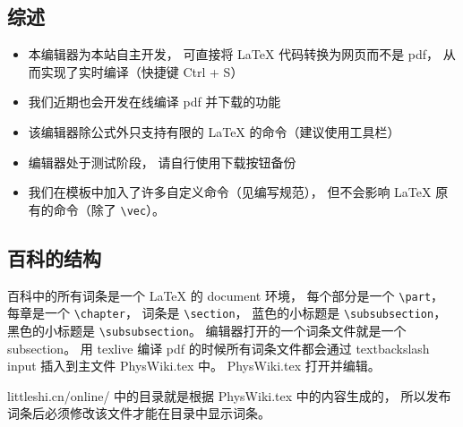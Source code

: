 
\subsection{综述}
\begin{itemize}
\item 本编辑器为本站自主开发， 可直接将 LaTeX 代码转换为网页而不是 pdf， 从而实现了实时编译（快捷键 Ctrl + S）
\item 我们近期也会开发在线编译 pdf 并下载的功能
\item 该编辑器除公式外只支持有限的 LaTeX 的命令（建议使用工具栏）
\item 编辑器处于测试阶段， 请自行使用下载按钮备份
\item 我们在模板中加入了许多自定义命令（见编写规范）， 但不会影响 LaTeX 原有的命令（除了 \lstinline|\vec|）。
\end{itemize}

\subsection{百科的结构}

百科中的所有词条是一个 LaTeX 的 document 环境， 每个部分是一个 \lstinline|\part|， 每章是一个 \lstinline|\chapter|， 词条是 \lstinline|\section|， 蓝色的小标题是 \lstinline|\subsubsection|， 黑色的小标题是 \lstinline|\subsubsection|。 编辑器打开的一个词条文件就是一个 subsection。 用 texlive 编译 pdf 的时候所有词条文件都会通过 textbackslash input 插入到主文件 PhysWiki.tex 中。 PhysWiki.tex 打开并编辑。

littleshi.cn/online/ 中的目录就是根据 PhysWiki.tex 中的内容生成的， 所以发布词条后必须修改该文件才能在目录中显示词条。

